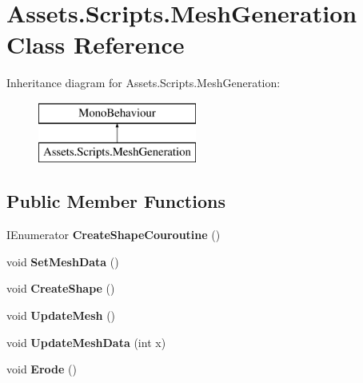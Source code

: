 \hypertarget{class_assets_1_1_scripts_1_1_mesh_generation}{}\section{Assets.\+Scripts.\+Mesh\+Generation Class Reference}
\label{class_assets_1_1_scripts_1_1_mesh_generation}
Inheritance diagram for Assets.\+Scripts.\+Mesh\+Generation\+:\begin{figure}[H]
\begin{center}
\leavevmode
\includegraphics[height=2.000000cm]{class_assets_1_1_scripts_1_1_mesh_generation}
\end{center}
\end{figure}
\subsection*{Public Member Functions}
\begin{DoxyCompactItemize}
\item 
\mbox{\label{class_assets_1_1_scripts_1_1_mesh_generation_ae7c87c523ebe4c7a891a77ff9fb22779}} 
I\+Enumerator {\bfseries Create\+Shape\+Couroutine} ()
\item 
\mbox{\label{class_assets_1_1_scripts_1_1_mesh_generation_a132027f38358668e6f8c320b00ee9327}} 
void {\bfseries Set\+Mesh\+Data} ()
\item 
\mbox{\label{class_assets_1_1_scripts_1_1_mesh_generation_aebf4b5f0cb1285927d7c44a03e98d78c}} 
void {\bfseries Create\+Shape} ()
\item 
\mbox{\label{class_assets_1_1_scripts_1_1_mesh_generation_a41a4e7a75db511109f7837f1f0fa376b}} 
void {\bfseries Update\+Mesh} ()
\item 
\mbox{\label{class_assets_1_1_scripts_1_1_mesh_generation_abaeb22e0f390a218be5d9543138f52b9}} 
void {\bfseries Update\+Mesh\+Data} (int x)
\item 
\mbox{\label{class_assets_1_1_scripts_1_1_mesh_generation_a4ca64ff2f5c1b7f9073699905628e6dd}} 
void {\bfseries Erode} ()
\end{DoxyCompactItemize}
